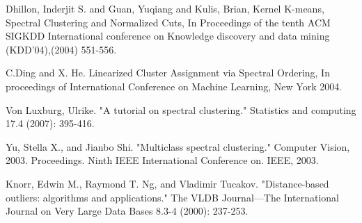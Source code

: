 \begin{thebibliography}{9}
Dhillon, Inderjit S. and Guan, Yuqiang and Kulis, Brian, Kernel K-means, Spectral Clustering and Normalized Cuts, In Proceedings of the tenth ACM SIGKDD International conference on Knowledge discovery and data mining (KDD’04),(2004) 551-556.

C.Ding and X. He. Linearized Cluster Assignment via Spectral Ordering, In proceedings of International Conference on Machine Learning, New York 2004.

Von Luxburg, Ulrike. "A tutorial on spectral clustering." Statistics and computing 17.4 (2007): 395-416.

Yu, Stella X., and Jianbo Shi. "Multiclass spectral clustering." Computer Vision, 2003. Proceedings. Ninth IEEE International Conference on. IEEE, 2003.

Knorr, Edwin M., Raymond T. Ng, and Vladimir Tucakov. "Distance-based outliers: algorithms and applications." The VLDB Journal—The International Journal on Very Large Data Bases 8.3-4 (2000): 237-253.

\end{thebibliography}
